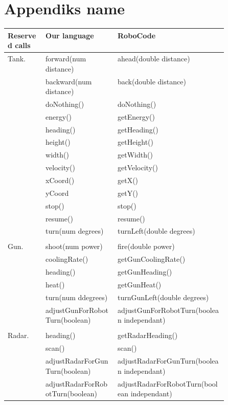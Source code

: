 \chapter{Appendiks name} \label{sec:ap1}
\begin{center}
    \begin{tabular}{ | l| l | p{0.5\linewidth} | }
    \hline
    Reserved calls & Our language & RoboCode \\ \hline
    Tank. & forward(num distance) & ahead(double distance)  \\ \hline
     & backward(num distance) & back(double distance)  \\ \hline
     & doNothing() & doNothing() \\ \hline
     & energy() & getEnergy() \\ \hline
     & heading() & getHeading() \\ \hline
     & height() & getHeight() \\ \hline
     & width() & getWidth()  \\ \hline
     & velocity() & getVelocity()  \\ \hline
     & xCoord() & getX() \\ \hline
     & yCoord & getY() \\ \hline
     & stop() & stop() \\ \hline
     & resume() & resume() \\ \hline
     & turn(num degrees) & turnLeft(double degrees)  \\ \hline
     & &  \\ \hline
    Gun. & shoot(num power) & fire(double power) \\ \hline
     & coolingRate() & getGunCoolingRate() \\ \hline
     & heading() & getGunHeading() \\ \hline
     & heat() & getGunHeat() \\ \hline
     & turn(num ddegrees) & turnGunLeft(double degrees)  \\ \hline
     & adjustGunForRobotTurn(boolean) & adjustGunForRobotTurn(boolean independant) \\ \hline
     & &  \\ \hline
    Radar. & heading() & getRadarHeading() \\ \hline
     & scan() & scan() \\ \hline
     & adjustRadarForGunTurn(boolean) & adjustRadarForGunTurn(boolean independant)  \\ \hline
     & adjustRadarForRobotTurn(boolean) & adjustRadarForRobotTurn(boolean independant) \\ \hline

\end{tabular}
\end{center}
